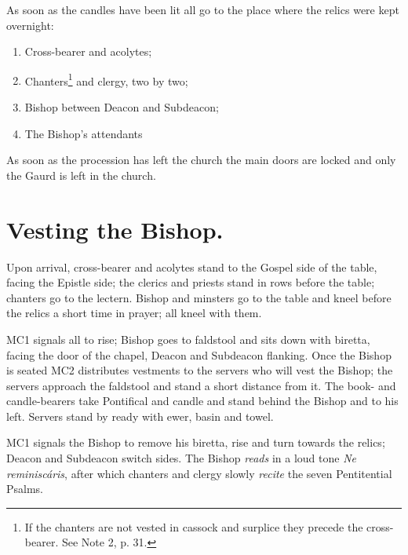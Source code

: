 \documentclass[letterpaper]{report}
\begin{document}
{    \rubric As soon as the candles have been lit all go to the place where the
    relics were kept overnight:

    \begin{enumerate}

        \item Cross-bearer and acolytes;

        \item Chanters\footnote{If the chanters are not vested in cassock and
            surplice they precede the cross-bearer. See \cite{consecranda} Note 2,
            p. 31.} and clergy, two by two;

        \item Bishop between Deacon and Subdeacon;

        \item The Bishop's attendants

    \end{enumerate}

    As soon as the procession has left the church the main doors are locked and
    only the Gaurd is left in the church.

    \section{Vesting the Bishop.}

    \rubric Upon arrival, cross-bearer and acolytes stand to the Gospel side of
    the table, facing the Epistle side; the clerics and priests stand in rows
    before the table; chanters go to the lectern. Bishop and minsters go to the
    table and kneel before the relics a short time in prayer; all kneel with
    them.

    \rubric MC1 signals all to rise; Bishop goes to faldstool and sits down
    with biretta, facing the door of the chapel, Deacon and Subdeacon flanking.
    Once the Bishop is seated MC2 distributes vestments to the servers who will
    vest the Bishop; the servers approach the faldstool and stand a short
    distance from it. The book- and candle-bearers take Pontifical and candle
    and stand behind the Bishop and to his left. Servers stand by ready with
    ewer, basin and towel.

    \rubric MC1 signals the Bishop to remove his biretta, rise and turn towards
    the relics; Deacon and Subdeacon switch sides. The Bishop \textit{reads} in
    a loud tone \textit{Ne reminisc\'aris}, after which chanters and clergy
    slowly \textit{recite} the seven Pentitential Psalms.

}
\end{document}
